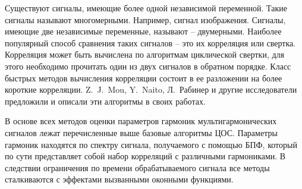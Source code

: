 Существуют сигналы, имеющие более одной независимой переменной. Такие сигналы называют многомерными. Например, сигнал изображения. Сигналы, имеющие две независимые переменные, называют -- двумерными.
Наиболее популярный способ сравнения таких сигналов – это их корреляция или свертка. Корреляция может быть вычислена по алгоритмам циклической свертки, для этого необходимо прочитать один из двух сигналов в обратном порядке. Класс быстрых методов вычисления корреляции состоит в ее разложении на более короткие корреляции. Z.~J.~Mou, Y.~Naito, Л.~Рабинер и другие исследователи предложили и описали эти алгоритмы в своих работах.




В основе всех методов оценки параметров гармоник мультигармонических сигналов лежат перечисленные выше базовые алгоритмы ЦОС. Параметры гармоник находятся по спектру сигнала, получаемого с помощью БПФ, который по сути представляет собой набор корреляций с различными гармониками. В следствии ограничения по времени обрабатываемого сигнала все методы сталкиваются с эффектами вызванными оконными функциями.

